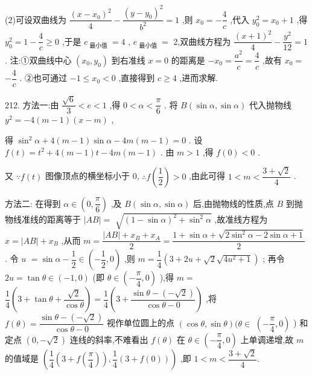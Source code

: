 (2)可设双曲线为 $\dfrac{{\left( x - {x}_{0}\right) }^{2}}{4} - \dfrac{{\left( y - {y}_{0}\right) }^{2}}{{b}^{2}} = 1$ ,则 ${x}_{0} =  - \dfrac{4}{c}$ ,代入 ${y}_{0}^{2} = {x}_{0} + 1$ ,得 ${y}_{0}^{2} = 1 - \dfrac{4}{c} \geq  0$ ,于是 ${c}_{\text{ 最小值 }} = 4$ , ${e}_{\text{ 最小值 }} =$ 2,双曲线方程为 $\dfrac{{\left( x + 1\right) }^{2}}{4} - \dfrac{{y}^{2}}{12} = 1$ . 注:①双曲线中心 $\left( {{x}_{0},{y}_{0}}\right)$ 到右准线 $x = 0$ 的距离是 $- {x}_{0} = \dfrac{{a}^{2}}{c} = \dfrac{4}{c}$ ,故有 ${x}_{0} =$  $- \dfrac{4}{c}$ . ②也可通过 $- 1 \leq  {x}_{0} < 0$ ,直接得到 $c \geq  4$ ,进而求解.

212. 方法一:由 $\dfrac{\sqrt{6}}{3} < e < 1$ ,得 $0 < \alpha  < \dfrac{\pi }{6}$ . 将 $B\left( {\sin \alpha ,\sin \alpha }\right)$ 代入抛物线 ${y}^{2} =  - 4\left( {m - 1}\right) \left( {x - m}\right)$ ,

得 ${\sin }^{2}\alpha  + 4\left( {m - 1}\right) \sin \alpha  - {4m}\left( {m - 1}\right)  = 0$ . 设 $f\left( t\right)  = {t}^{2} + 4\left( {m - 1}\right) t - {4m}\left( {m - 1}\right)$ . 由 $m > 1$ ,得 $f\left( 0\right)  < 0$ .

又 $\because f\left( t\right)$ 图像顶点的横坐标小于 0, $\therefore f\left( \dfrac{1}{2}\right)  > 0$ ,由此可得 $1 < m < \dfrac{3 + \sqrt{2}}{4}$ .

方法二: 在得到 $\alpha  \in  \left( {0,\dfrac{\pi }{6}}\right)$ ,及 $B\left( {\sin \alpha ,\sin \alpha }\right)$ 后,由抛物线的性质,点 $B$ 到抛物线准线的距离等于 $\left| {AB}\right|  =$  $\sqrt{{\left( 1 - \sin \alpha \right) }^{2} + {\sin }^{2}\alpha }$ ,故准线方程为 $x = \left| {AB}\right|  + {x}_{B}$ ,从而 $m = \dfrac{\left| {AB}\right|  + {x}_{B} + {x}_{A}}{2} = \dfrac{1 + \sin \alpha  + \sqrt{2{\sin }^{2}\alpha  - 2\sin \alpha  + 1}}{2}$ . 令 $u$  $= \sin \alpha  - \dfrac{1}{2} \in  \left( {-\dfrac{1}{2},0}\right)$ ,则 $m = \dfrac{1}{4}\left( {3 + {2u} + \sqrt{2}\sqrt{4{u}^{2} + 1}}\right)$ ; 再令 ${2u} = \tan \theta  \in  \left( {-1,0}\right)$ (即 $\theta  \in  \left( {-\dfrac{\pi }{4},0}\right)$ ),得 $m =$  $\dfrac{1}{4}\left( {3 + \tan \theta  + \dfrac{\sqrt{2}}{\cos \theta }}\right)  = \dfrac{1}{4}\left( {3 + \dfrac{\sin \theta  - \left( {-\sqrt{2}}\right) }{\cos \theta  - 0}}\right)$ ,将 $f\left( \theta \right)  = \dfrac{\sin \theta  - \left( {-\sqrt{2}}\right) }{\cos \theta  - 0}$ 视作单位圆上的点 $\left( {\cos \theta ,\sin \theta }\right) (\theta  \in$  $\left( {-\dfrac{\pi }{4},0}\right)$ ) 和定点 $\left( {0, - \sqrt{2}}\right)$ 连线的斜率,不难看出 $f\left( \theta \right)$ 在 $\theta  \in  \left( {-\dfrac{\pi }{4},0}\right)$ 上单调递增,故 $m$ 的值域是 $\left( {\dfrac{1}{4}\left( {3 + f\left( \dfrac{\pi }{4}\right) }\right) ,\dfrac{1}{4}\left( {3 + f\left( 0\right) }\right) }\right)$ ,即 $1 < m < \dfrac{3 + \sqrt{2}}{4}.$

